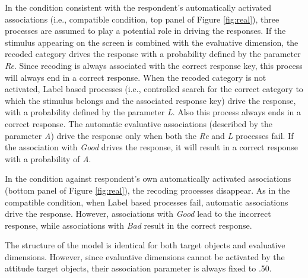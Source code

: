 \documentclass[12pt]{book}
\begin{document}


In the condition consistent with the respondent's automatically activated associations (i.e., compatible condition, top panel of Figure \ref{fig:real}), three processes are assumed to play a potential role in driving the responses. 
If the stimulus appearing on the screen is combined with the evaluative dimension, the recoded category drives the response with a probability defined by the parameter \emph{Re}. Since recoding is always associated with the correct response key, this process will always end in a correct response. 
When the recoded category is not activated, Label based processes (i.e., controlled search for the correct category to which the stimulus belongs and the associated response key) drive the response, with a probability defined by the parameter \emph{L}. Also this process always ends in a correct response. 
The automatic evaluative associations (described by the parameter \emph{A}) drive the response only when both the \emph{Re} and \emph{L} processes fail. If the association with \emph{Good} drives the response, it will result in a correct response with a probability of \emph{A}.

In the condition against respondent's own automatically activated associations (bottom panel of Figure \ref{fig:real}), the recoding processes disappear. 
As in the compatible condition, when Label based processes fail, automatic associations drive the response. However, associations with \emph{Good} lead to the incorrect response, while associations with \emph{Bad} result in the correct response.

The structure of the model is identical for both target objects and evaluative dimensions. However, since evaluative dimensions cannot be activated by the attitude target objects, their association parameter is always fixed to .50.
\end{document}
